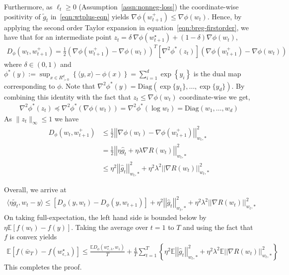 \documentclass[11pt,letterpaper]{article}
\newcommand{\E}{\mathbb{E}}
\newcommand{\wopt}{w^\star_{\epsilon, \lambda}}
\newcommand{\Exs}{\mathbb{E}}
\newcommand{\gtilde}{\widetilde{g}}
\newcommand{\grad}{\nabla}
\newcommand{\loss}{\ell}
\theoremstyle{plain}
\theoremstyle{definition}  %
\begin{document}
\noindent Furthermore, as $\loss_t \geq 0$ (Assumption~\ref{assn:nonneg-loss}) the coordinate-wise positivity of $\gtilde_t$ in~\eqref{eqn:wtplus-eqn} yields $\nabla\phi(w^{+}_{t +1})\le\nabla\phi(w_t)$. Hence, by applying the second order Taylor expansion in equation~\eqref{eqn:breg-firstorder}, we have that for an intermediate point $ z_t = \delta \ \grad \phi(w^\star_{t+1})+ (1-\delta) \grad \phi(w_{t})$,
    \begin{align*}
        D_\phi(w_t,w^{+}_{t +1})=\frac{1}{2}\left(\nabla\phi(w^{+}_{t +1})-\nabla\phi(w_t)\right)^T \left[\nabla^2{\phi^\ast}(z_t)\right]\left(\nabla\phi(w^{+}_{t +1})-\nabla\phi(w_t)\right)
    \end{align*}
    where $\delta \in (0,1)$ and $\phi^\ast(y):=\sup_{x\in R^d_{>0}}\left\{\langle y,x\rangle-\phi(x)\right\}=\sum_{i=1}^d \exp\left\{y_i\right\}$ is the dual map corresponding to $\phi$.  Note that $\nabla^2\phi^\ast(y)=\text{Diag}\left(\exp\{y_1\},\ldots,\exp\{y_d\}\right)$. By combining this identity with the fact that $z_t \leq \nabla \phi(w_t)$ coordinate-wise we get,
    \begin{align*}
        \nabla^2{\phi^\ast}(z_t)\preceq\nabla^2{\phi^\ast}(\nabla\phi(w_t))=\nabla^2{\phi^*}\left(\log w_t \right)=\text{Diag}(w_1,\ldots,w_d)
    \end{align*}
    As $\|z_t \|_\infty \leq 1$ we have
    \begin{align*}
        D_\phi(w_t,w^{+}_{t +1})&\le \frac{1}{2}\left|\left|\nabla\phi(w_t)-\nabla\phi(w^{+}_{t +1})\right|\right|_{w_t,\ast}^2\\
        &=\frac{1}{2}\left|\left|\eta \widehat{g}_t+\eta\lambda\nabla R(w_t)\right|\right|_{w_t,\ast}^2\\
        &\le \eta^2\left|\left|\widehat{g}_t\right|\right|_{w_t,\ast}^2+\eta^2\lambda^2\left|\left|\nabla R(w_t)\right|\right|_{w_t,\ast}^2 
    \end{align*}

\noindent   
Overall, we arrive at
\begin{align}
\label{eqn:master-eqn}
    \langle\eta \widetilde{g}_t,w_t-y\rangle\le\left[D_\phi(y,w_t)-D_\phi(y,w_{t+1})\right]+\eta^2\left|\left|\widehat{g}_t\right|\right|_{w_t,\ast}^2+\eta^2\lambda^2\left|\left|\nabla R(w_t)\right|\right|_{w_t,\ast}^2
\end{align}
On taking full-expectation, the left hand side is bounded below by $\eta\E[f(w_t)-f(y)]$. Taking the average over $t=1$ to $T$ and  using the fact that $f$ is convex yields 
\begin{align*}
\E\left[ f(\bar{w}_T) - f(\wopt) \right] \le
\frac{\Exs D_\phi(\wopt,w_1)}{T} +  \frac{4}{T} \sum_{t = 1}^T \left\lbrace \eta^2\Exs \left|\left|\widehat{g}_t\right|\right|_{w_t,\ast}^2+\eta^2\lambda^2 \Exs \left|\left|\nabla R(w_t)\right|\right|_{w_t,\ast}^2 \right\rbrace 
\end{align*}
This completes the proof. 
\end{document}
